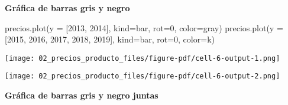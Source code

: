 \documentclass[
  letterpaper,
  DIV=11,
  numbers=noendperiod]{scrreprt}
\newenvironment{Shaded}{\begin{snugshade}}{\end{snugshade}}
\newcommand{\DecValTok}[1]{\textcolor[rgb]{0.68,0.00,0.00}{#1}}
\newcommand{\NormalTok}[1]{\textcolor[rgb]{0.00,0.23,0.31}{#1}}
\newcommand{\OperatorTok}[1]{\textcolor[rgb]{0.37,0.37,0.37}{#1}}
\newcommand{\StringTok}[1]{\textcolor[rgb]{0.13,0.47,0.30}{#1}}
\begin{document}
\textbf{Gráfica de barras gris y negro}

\begin{Shaded}
\begin{Highlighting}[]
\NormalTok{precios.plot(y }\OperatorTok{=}\NormalTok{ [}\DecValTok{2013}\NormalTok{, }\DecValTok{2014}\NormalTok{], kind}\OperatorTok{=}\StringTok{\textquotesingle{}bar\textquotesingle{}}\NormalTok{, rot}\OperatorTok{=}\DecValTok{0}\NormalTok{, color}\OperatorTok{=}\StringTok{\textquotesingle{}gray\textquotesingle{}}\NormalTok{)}
\NormalTok{precios.plot(y }\OperatorTok{=}\NormalTok{ [}\DecValTok{2015}\NormalTok{, }\DecValTok{2016}\NormalTok{, }\DecValTok{2017}\NormalTok{, }\DecValTok{2018}\NormalTok{, }\DecValTok{2019}\NormalTok{], kind}\OperatorTok{=}\StringTok{\textquotesingle{}bar\textquotesingle{}}\NormalTok{, rot}\OperatorTok{=}\DecValTok{0}\NormalTok{, color}\OperatorTok{=}\StringTok{\textquotesingle{}k\textquotesingle{}}\NormalTok{)}
\end{Highlighting}
\end{Shaded}

\texttt{[image: 02\_precios\_producto\_files/figure-pdf/cell-6-output-1.png]}

\texttt{[image: 02\_precios\_producto\_files/figure-pdf/cell-6-output-2.png]}

\textbf{Gráfica de barras gris y negro juntas}
\end{document}
